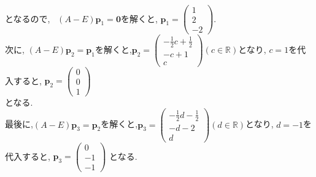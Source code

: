 \documentclass{jsarticle}
\begin{document}
となるので, \ 
$(A-E) \bm{p}_1 = \bm{0}$を解くと, 
$\bm{p}_1=
\left(\begin{array}{c}
1 \\
2 \\
-2
\end{array}\right).$ \\
次に, $(A-E) \bm{p}_2=\bm{p}_1$を解くと,$\bm{p}_2=\left(\begin{array}{c}
-\frac{1}{2} c+\frac{1}{2} \\
-c+1 \\
c
\end{array}\right)
(c \in \mathbb{R})
$となり, 
$c=1$を代入すると, 
$\bm{p}_2=\left(\begin{array}{c}
0 \\
0 \\
1
\end{array}\right)$ \\
となる. \\
最後に,$(A-E) \bm{p}_3=\bm{p}_2$を解くと,$\bm{p}_3=\left(\begin{array}{c}
-\frac{1}{2} d-\frac{1}{2} \\
-d-2 \\
d
\end{array}\right)(d \in \mathbb{R})$となり, 
$d=-1$を代入すると, 
$\bm{p}_3=\left(\begin{array}{c}
0 \\
-1 \\
-1
\end{array}\right)$
となる.
\end{document}
